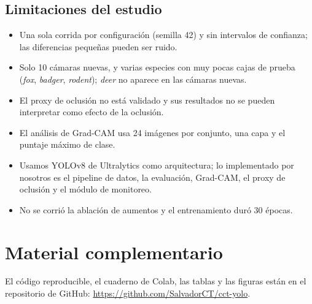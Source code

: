 \documentclass[10pt,letterpaper]{article}
\begin{document}
\subsection{Limitaciones del estudio}
\begin{itemize}
  \item Una sola corrida por configuración (semilla 42) y sin intervalos de confianza; las diferencias pequeñas pueden ser ruido.
  \item Solo 10 cámaras nuevas, y varias especies con muy pocas cajas de prueba (\emph{fox}, \emph{badger}, \emph{rodent}); \emph{deer} no aparece en las cámaras nuevas.
  \item El proxy de oclusión no está validado y sus resultados no se pueden interpretar como efecto de la oclusión.
  \item El análisis de Grad-CAM usa 24 imágenes por conjunto, una capa y el puntaje máximo de clase.
  \item Usamos YOLOv8 de Ultralytics como arquitectura; lo implementado por nosotros es el pipeline de datos, la evaluación, Grad-CAM, el proxy de oclusión y el módulo de monitoreo.
  \item No se corrió la ablación de aumentos y el entrenamiento duró 30 épocas.
\end{itemize}

\section{Material complementario}
El código reproducible, el cuaderno de Colab, las tablas y las figuras están en el repositorio de GitHub: \url{https://github.com/SalvadorCT/cct-yolo}.



\end{document}
